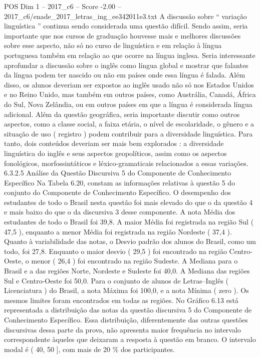\begin{textsample}{POS Dim 1 – 2017\_c6 – Score -2.00 – 2017\_c6/enade\_2017\_letras\_ing\_ee342011e3.txt}
A discussão sobre “ variação linguística ” continua sendo considerada uma questão difícil.
Sendo assim, seria importante que nos cursos de graduação houvesse mais e melhores discussões sobre esse aspecto, não só no curso de linguística e em relação à língua portuguesa também em relação ao que ocorre na língua inglesa.
Seria interessante aprofundar a discussão sobre o inglês como língua global e mostrar que falantes da língua podem ter nascido ou não em países onde essa língua é falada.
Além disso, os alunos deveriam ser expostos ao inglês usado não só nos Estados Unidos e no Reino Unido, mas também em outros países, como Austrália, Canadá, África do Sul, Nova Zelândia, ou em outros países em que a língua é considerada língua adicional.
Além da questão geográfica, seria importante discutir como outros aspectos, como a classe social, a faixa etária, o nível de escolaridade, o gênero e a situação de uso ( registro ) podem contribuir para a diversidade linguística.
Para tanto, dois conteúdos deveriam ser mais bem explorados : a diversidade linguística do inglês e seus aspectos geopolíticos, assim como os aspectos fonológicos, morfossintáticos e léxico-gramaticais relacionados a essas variações. 6.3.2.5 Análise da Questão Discursiva 5 do Componente de Conhecimento Específico Na Tabela 6.20, constam as informações relativas à questão 5 do conjunto do Componente de Conhecimento Específico.
O desempenho dos estudantes de todo o Brasil nesta questão foi mais elevado do que o da questão 4 e mais baixo do que o da discursiva 3 desse componente.
A nota Média dos estudantes de todo o Brasil foi 39,8.
A maior Média foi registrada na região Sul ( 47,5 ), enquanto a menor Média foi registrada na região Nordeste ( 37,4 ).
Quanto à variabilidade das notas, o Desvio padrão dos alunos do Brasil, como um todo, foi 27,8.
Enquanto o maior desvio ( 29,5 ) foi encontrado na região Centro-Oeste, o menor ( 26,4 ) foi encontrado na região Sudeste.
A Mediana para o Brasil e a das regiões Norte, Nordeste e Sudeste foi 40,0.
A Mediana das regiões Sul e Centro-Oeste foi 50,0.
Para o conjunto de alunos de Letras–Inglês ( Licenciatura ) do Brasil, a nota Máxima foi 100,0, e a nota Mínima ( zero ).
Os mesmos limites foram encontrados em todas as regiões.
No Gráfico 6.13 está representada a distribuição das notas da questão discursiva 5 do Componente de Conhecimento Específico.
Essa distribuição, diferentemente das outras questões discursivas dessa parte da prova, não apresenta maior frequência no intervalo correspondente àqueles que deixaram a resposta à questão em branco.
O intervalo modal é ( 40, 50 ], com mais de 20 \% dos participantes.

\end{textsample}
